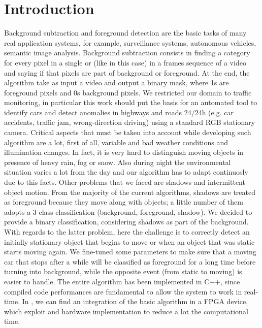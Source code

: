 \section*{Introduction}
Background subtraction and foreground detection are the basic tasks of many real application systems,
for example, surveillance systems, autonomous vehicles, semantic image analysis. Background subtraction
consists in finding a category for every pixel in a single or (like in this case) in a frames sequence
of a video and saying if that pixels are part of background or foreground. At the end, the algorithm take as input a video and output a binary mask, where 1s are foreground pixels and 0s background pixels.
We restricted our domain to traffic monitoring, in particular this work should put the basis for an automated
tool to identify cars and detect anomalies in highways and roads 24/24h (e.g. car accidents,
traffic jam, wrong-direction driving) using a standard RGB stationary camera.
Critical aspects that must be taken into account while developing such algorithm are a lot, first of all,
variable and bad weather conditions and illumination changes. In fact, it is very hard to distinguish
moving objects in presence of heavy rain, fog or snow. Also during night the environmental situation varies
a lot from the day and our algorithm has to adapt continuosly due to this facts. 
Other problems that we faced are shadows and intermittent object motion.
From the majority of the current algorithms, shadows are treated as foreground because they move along with
objects; a little number of them adopts a 3-class classification (background, foreground, shadow). We
decided to provide a binary classification, considering shadows as part of the background. With regards to
the latter problem, here the challenge is to correctly detect an initially stationary object that begins to
move or when an object that was static starts moving again. We fine-tuned some parameters to make sure
that a moving car that stops after a while will be classified as foreground for a long time before turning
into background, while the opposite event (from static to moving) is easier to handle.
The entire algorithm has been implemented in C++, since compiled code performances are fundamental to
allow the system to work in real-time. In \cite{pbas_and_scene_analysis_fpga}, we can find an integration of
the basic algorithm in a FPGA device, which exploit and hardware implementation to reduce a lot the computational time.

